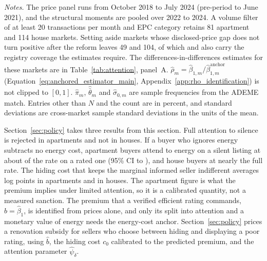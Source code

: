 \begin{table}[t]
\begin{minipage}{\linewidth}
\footnotesize\textit{Notes.} The price panel runs from October 2018 to July 2024 (pre-period to June 2021), and the structural moments are pooled over 2022 to 2024. A volume filter of at least 20 transactions per month and EPC category retains 81 apartment and 114 house markets. Setting aside markets whose disclosed-price gap does not turn positive after the reform leaves 49 and 104, of which \attNMarketsApt{} and \attNMarketsHouse{} also carry the registry coverage the estimates require. The differences-in-differences estimates for these markets are in Table~\ref{tab:attention}, panel~A. $\hat\rho_m=\hat\beta_{1,m}/\hat\beta_{1,m}^{\mathrm{anchor}}$ (Equation~\eqref{eq:anchored_estimator_main}, Appendix~\ref{app:rho_identification}) is not clipped to $[0,1]$. $\hat\pi_m$, $\hat{\bar\theta}_m$ and $\hat\sigma_{0,m}$ are sample frequencies from the ADEME match. Entries other than $N$ and the count are in percent, and standard deviations are cross-market sample standard deviations in the units of the mean.
\end{minipage}
\end{table}

Section~\ref{sec:policy} takes three results from this section. Full attention to silence is rejected in apartments and not in houses. If a buyer who ignores energy subtracts no energy cost, apartment buyers attend to energy on a silent listing at about \attPsiApt{} of the rate on a rated one (95\% CI \attPsiLoApt{} to \attPsiHiApt{}), and house buyers at nearly the full rate. The hiding cost that keeps the marginal informed seller indifferent averages \attDthreeApt{} log points in apartments and \attDthreeHouse{} in houses. The apartment figure is what the premium implies under limited attention, so it is a calibrated quantity, not a measured sanction. The premium that a verified efficient rating commands, $\hat b=\hat\beta_1$, is identified from prices alone, and only its split into attention and a monetary value of energy needs the energy-cost anchor. Section~\ref{sec:policy} prices a renovation subsidy for sellers who choose between hiding and displaying a poor rating, using $\hat b$, the hiding cost $c_0$ calibrated to the predicted premium, and the attention parameter $\hat\psi_\delta$.
